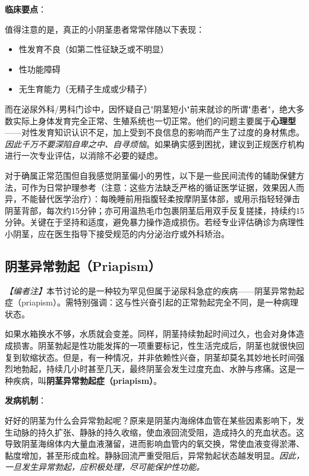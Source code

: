 \documentclass[12pt,a4paper,twoside]{ctexbook}
\begin{document}
\vspace{0.5em}
\noindent\textbf{临床要点}：

值得注意的是，真正的小阴茎患者常常伴随以下表现：
\begin{itemize}
	\item 性发育不良（如第二性征缺乏或不明显）
	\item 性功能障碍
	\item 无生育能力（无精子生成或少精子）
\end{itemize}

而在泌尿外科/男科门诊中，因怀疑自己"阴茎短小"前来就诊的所谓"患者"，绝大多数实际上身体发育完全正常、生殖系统也一切正常。他们的问题主要属于\textbf{心理型}——对性发育知识认识不足，加上受到不良信息的影响而产生了过度的身材焦虑。\textit{因此千万不要深陷自卑之中、自寻烦恼}。如果确实感到困扰，建议到正规医疗机构进行一次专业评估，以消除不必要的疑虑。

\begin{tcolorbox}[colback=pink!5!white,colframe=red!50!black,title=贴心小叮咛]
对于确属正常范围但自我感觉阴茎偏小的男性，以下是一些民间流传的辅助保健方法，可作为日常护理参考（注意：这些方法缺乏严格的循证医学证据，效果因人而异，不能替代医学治疗）：每晚睡前用指腹轻柔按摩阴茎体部，或用示指轻轻弹击阴茎背部，每次约15分钟；亦可用温热毛巾包裹阴茎后用双手反复搓揉，持续约15分钟。关键在于坚持和适度，避免暴力操作造成损伤。若经专业评估确诊为病理性小阴茎，应在医生指导下接受规范的内分泌治疗或外科矫治。
\end{tcolorbox}

\subsection{阴茎异常勃起（Priapism）}

\noindent\textit{【编者注】}本节讨论的是一种较为罕见但属于泌尿科急症的疾病——阴茎异常勃起症（priapism）。需特别强调：这与性兴奋引起的正常勃起完全不同，是一种病理状态。

\vspace{0.5em}
如果水箱换水不够，水质就会变差。同样，阴茎持续勃起时间过久，也会对身体造成损害。阴茎勃起是性功能发挥的一项重要标记，性生活完成后，阴茎也就很快回复到软缩状态。但是，有一种情况，并非依赖性兴奋，阴茎却莫名其妙地长时间强烈地勃起，持续几小时甚至几天，最终阴茎会发生过度充血、水肿与疼痛。这是一种疾病，叫\textbf{阴茎异常勃起症（priapism）}。

\vspace{0.5em}
\noindent\textbf{发病机制}：

好好的阴茎为什么会异常勃起呢？原来是阴茎内海绵体血管在某些因素影响下，发生动脉的持久扩张、静脉的持久收缩，使血液回流受阻，造成持久的充血状态。这导致阴茎海绵体内大量血液潴留，进而影响血管内的氧交换，常使血液变得淤滞、黏度增加，甚至形成血栓。静脉回流严重受阻后，异常勃起状态越发明显。\textit{因此，一旦发生异常勃起，应积极处理，尽可能保护性功能。}
\end{document}
